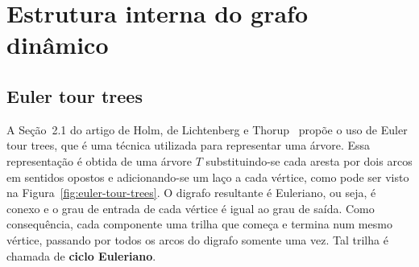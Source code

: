 \section{Estrutura interna do grafo dinâmico}
\label{sec:dynamic-graph-implementation}

\subsection{Euler tour trees}
\label{sec:euler-tour-trees}

A Seção~2.1 do artigo de Holm, de Lichtenberg e Thorup~\cite{jacob_holm} propõe o uso de Euler tour trees, que é uma técnica utilizada para representar uma árvore. Essa representação é obtida de uma árvore $T$ substituindo-se cada aresta por dois arcos em sentidos opostos e adicionando-se um laço a cada vértice, como pode ser visto na Figura~\ref{fig:euler-tour-trees}. O digrafo resultante é Euleriano, ou seja, é conexo e o grau de entrada de cada vértice é igual ao grau de saída. Como consequência, cada componente uma trilha que começa e termina num mesmo vértice, passando por todos os arcos do digrafo somente uma vez. Tal trilha é chamada de \textbf{ciclo Euleriano}.

